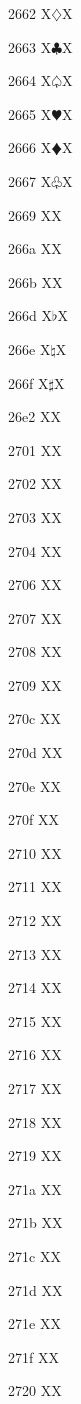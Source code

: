 \documentclass[11pt]{article}
\begin{document}
2662 X{\ensuremath{\diamondsuit}}X

2663 X{\ensuremath{\clubsuit}}X

2664 X{\ensuremath{\varspadesuit}}X

2665 X{\ensuremath{\varheartsuit}}X

2666 X{\ensuremath{\vardiamondsuit}}X

2667 X{\ensuremath{\varclubsuit}}X

2669 X{\quarternote}X

266a X{\eighthnote}X

266b X{\twonotes}X

266d X{\ensuremath{\flat}}X

266e X{\ensuremath{\natural}}X

266f X{\ensuremath{\sharp}}X

26e2 X{\uranus}X

2701 X{}X

2702 X{}X

2703 X{}X

2704 X{}X

2706 X{}X

2707 X{}X

2708 X{}X

2709 X{}X

270c X{}X

270d X{}X

270e X{}X

270f X{}X

2710 X{}X

2711 X{}X

2712 X{}X

2713 X{}X

2714 X{}X

2715 X{}X

2716 X{}X

2717 X{}X

2718 X{}X

2719 X{}X

271a X{}X

271b X{}X

271c X{}X

271d X{}X

271e X{}X

271f X{}X

2720 X{}X
\end{document}
